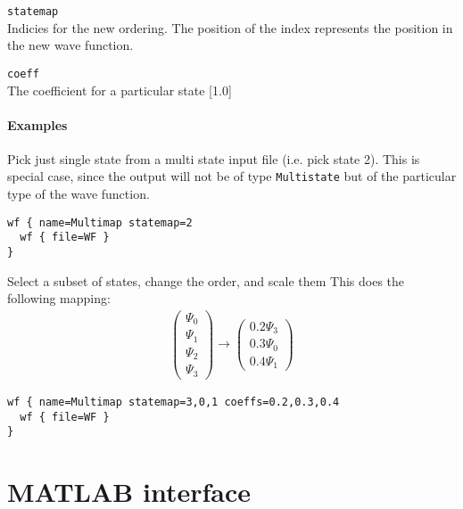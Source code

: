 \documentclass[a4paper,12pt]{scrbook}
\newcommand{\option}[2]{\item \texttt{#1}\\ #2}
\begin{document}
\begin{options}
 \option{statemap}{Indicies for the new ordering. The position of the index represents the position in the new wave function.}
 \option{coeff}{The coefficient for a particular state [1.0]}
\end{options}

\subsubsection*{Examples}
Pick just single state from a multi state input file (i.e. pick state 2). This is special case, since
the output will not be of type \verb|Multistate| but of the particular type of the wave function.
\begin{verbatim}
wf { name=Multimap statemap=2
  wf { file=WF }
}
\end{verbatim}

Select a  subset of states, change the order, and scale them This does the following mapping:
\begin{align}
\begin{pmatrix}
\Psi_0 \\ \Psi_1 \\ \Psi_2 \\ \Psi_3
\end{pmatrix}
\rightarrow
\begin{pmatrix}
0.2 \Psi_3 \\ 0.3 \Psi_0 \\ 0.4\Psi_1
\end{pmatrix}
\nonumber
\end{align}
\begin{verbatim}
wf { name=Multimap statemap=3,0,1 coeffs=0.2,0.3,0.4
  wf { file=WF }
}
\end{verbatim}


\chapter{MATLAB interface}




\end{document}
